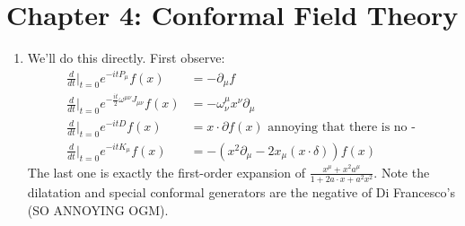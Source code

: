 \documentclass[11pt]{article}
\begin{document}
	

\section*{Chapter 4: Conformal Field Theory} %
\label{sec:chapter_4_conformal_field_theory}

\begin{enumerate}
	\item We'll do this directly. First observe:
	\begin{equation}
		\begin{aligned}
			\frac{d}{dt}|_{t=0} e^{-i t P_\mu} f(x) &= -\partial_\mu f\\
			\frac{d}{dt}|_{t=0} e^{-\frac{i t}{2} \omega^{\mu \nu} J_{\mu \nu}} f(x) &= - \omega^{\mu}_\nu x^\nu \partial_\mu \\
			\frac{d}{dt}|_{t=0} e^{-i t D} f(x) &= x \cdot \partial f(x) \text{ annoying that there is no - }\\
			\frac{d}{dt}|_{t=0} e^{-i t K_\mu} f(x) &= - (x^2 \partial_\mu - 2 x_\mu (x \cdot \delta)) f(x)
		\end{aligned}
	\end{equation}
	The last one is exactly the first-order expansion of $\frac{x^\mu + x^2 a^\mu}{1 + 2 a \cdot x + a^2 x^2}$. 
	Note the dilatation and special conformal generators are the negative of Di Francesco's (SO ANNOYING OGM).
	

\end{enumerate}
\end{document}
